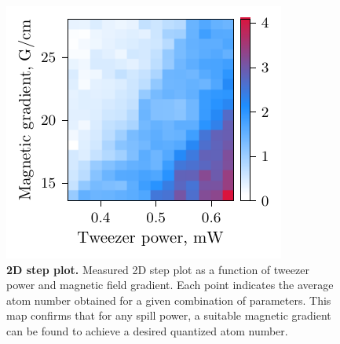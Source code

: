 \begin{figure}
    \centering
    \includegraphics{fig-py/step-plot-2d.pdf}
    \caption[2D step plot]{
        \textbf{2D step plot.}
        Measured 2D step plot as a function of tweezer power and magnetic field gradient. Each point indicates the average atom number obtained for a given combination of parameters. This map confirms that for any spill power, a suitable magnetic gradient can be found to achieve a desired quantized atom number.
    }
    \label{fig:spillingadd-2d}
\end{figure}

